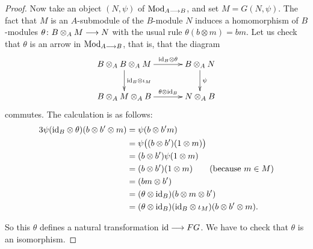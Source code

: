 \begin{4   STACKS}
\begin{4.2 Descent for quasi-coherent sheaves}
\begin{proof}
Now take an object $(N, \psi)$ of $\catmod{A \arr B}$, and set $M = G(N, \psi)$. The fact that $M$ is an $A$-submodule of the $B$-module $N$ induces a homomorphism of $B$-modules $\theta \colon B \otimes_A M \arr N$ with the usual rule $\theta(b \otimes m) = bm$.  Let us check that $\theta$ is an arrow in $\catmod{A \arr B}$, that is, that the diagram
   \[
   \xymatrix@C+10pt{
   B \otimes_A B \otimes_A M
      \ar[r]^-{\id_B \otimes \theta} \ar[d]^{\id_B \otimes \iota_M}&
   B \otimes_A N
      \ar[d]^\psi\\
   B \otimes_A M \otimes_A B 
      \ar[r]^-{\theta \otimes \id_B}&
   N \otimes_A B
   }
   \]
commutes. The calculation is as follows:
   \begin{alignat*}3
   \psi(\id_B \otimes \theta)(b \otimes b' \otimes m) &=
      \psi(b \otimes b'm)\\
   &= \psi\bigl((b \otimes b') (1 \otimes m)\bigr)\\
   &= (b \otimes b') \psi(1 \otimes m)\\
   &= (b \otimes b') (1 \otimes m)
   \qquad \text{(because $m \in M$)}\\
   &= (bm \otimes b')\\
   &= (\theta\otimes\id_B)(b \otimes m \otimes b')\\
   &= (\theta \otimes \id_B) (\id_B \otimes \iota_M)
      (b \otimes b' \otimes m).
   \end{alignat*}

So this $\theta$ defines a natural transformation $\id \arr FG$. We have to check that $\theta$ is an isomorphism.


\end{proof}
\end{4.2 Descent for quasi-coherent sheaves}
\end{4   STACKS}
